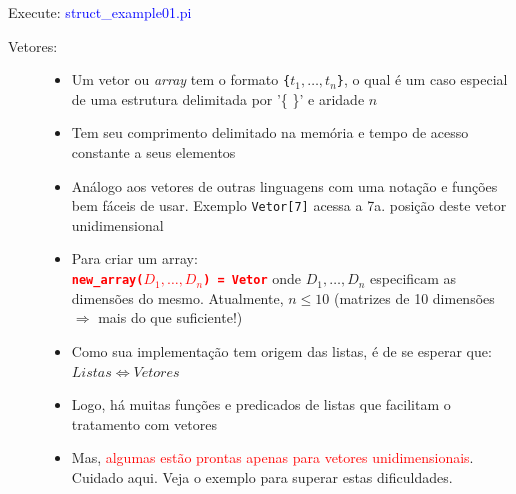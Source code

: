 \documentclass[10pt]{beamer}
\begin{document}
\begin{frame} [allowframebreaks=0.9]
\begin{description}
    \end{description}
     
     Execute: \textcolor{blue}{struct\_example01.pi}\\
         
     
     \newpage
     
     
    \begin{description}      
     
      
       \item[Vetores:] 
           
           \begin{itemize}
  \item Um vetor ou \textit{array} tem o formato \texttt{\{$t_1,…,t_n$\}}, o qual é um caso especial de uma estrutura delimitada por  '\{  \}’ e aridade $n$
  \item Tem seu comprimento delimitado na memória e tempo de acesso 
  constante a seus elementos
  
  \item Análogo aos vetores de outras linguagens com uma notação e funções bem fáceis de usar. Exemplo \texttt{Vetor[7]} acessa a 7a. posição deste vetor unidimensional
             
  \item Para criar um array:\\
       \textbf{\textcolor{red}{\texttt{new\_array($D_1, …, D_n$) = Vetor}}} onde $D_1, …, D_n$ especificam as dimensões do mesmo. Atualmente, $n \le 10$ (matrizes de  10 dimensões $\Rightarrow $ mais do que suficiente!) 
             
    \item Como sua implementação tem origem das listas, é de se esperar que: $Listas \Leftrightarrow Vetores$           
    
 \item Logo, há muitas funções e predicados de listas  que facilitam o tratamento  com vetores
    
  \item Mas, \textcolor{red}{algumas estão prontas apenas para vetores unidimensionais}. Cuidado aqui. Veja o exemplo para superar estas dificuldades.  
            
           \end{itemize}
 \end{description}
           

\end{frame}
\end{document}
